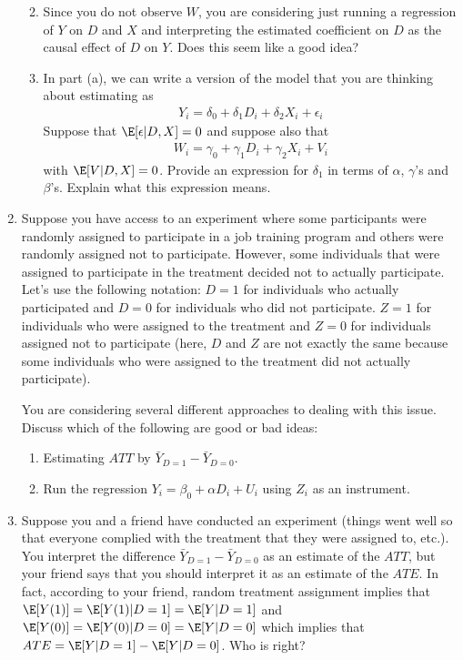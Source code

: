 \documentclass[
  letterpaper,
  DIV=11,
  numbers=noendperiod]{scrreprt}
\begin{document}
\begin{enumerate}
  \begin{enumerate}
  \def\labelenumii{\alph{enumii})}
  \item
    Since you do not observe \(W\), you are considering just running a
    regression of \(Y\) on \(D\) and \(X\) and interpreting the
    estimated coefficient on \(D\) as the causal effect of \(D\) on
    \(Y\). Does this seem like a good idea?
  \item
    In part (a), we can write a version of the model that you are
    thinking about estimating as \begin{align*}
       Y_i = \delta_0 + \delta_1 D_i + \delta_2 X_i + \epsilon_i
     \end{align*} Suppose that \(\E[\epsilon | D, X] = 0\) and suppose
    also that \begin{align*}
    W_i = \gamma_0 + \gamma_1 D_i + \gamma_2 X_i + V_i
      \end{align*} with \(\E[V|D,X]=0\). Provide an expression for
    \(\delta_1\) in terms of \(\alpha\), \(\gamma\)'s and \(\beta\)'s.
    Explain what this expression means.
  \end{enumerate}
\item
  Suppose you have access to an experiment where some participants were
  randomly assigned to participate in a job training program and others
  were randomly assigned not to participate. However, some individuals
  that were assigned to participate in the treatment decided not to
  actually participate. Let's use the following notation: \(D=1\) for
  individuals who actually participated and \(D=0\) for individuals who
  did not participate. \(Z=1\) for individuals who were assigned to the
  treatment and \(Z=0\) for individuals assigned not to participate
  (here, \(D\) and \(Z\) are not exactly the same because some
  individuals who were assigned to the treatment did not actually
  participate).

  You are considering several different approaches to dealing with this
  issue. Discuss which of the following are good or bad ideas:

  \begin{enumerate}
  \def\labelenumii{\alph{enumii})}
  \item
    Estimating \(ATT\) by \(\bar{Y}_{D=1} - \bar{Y}_{D=0}\).
  \item
    Run the regression \(Y_i = \beta_0 + \alpha D_i + U_i\) using
    \(Z_i\) as an instrument.
  \end{enumerate}
\item
  Suppose you and a friend have conducted an experiment (things went
  well so that everyone complied with the treatment that they were
  assigned to, etc.). You interpret the difference
  \(\bar{Y}_{D=1} - \bar{Y}_{D=0}\) as an estimate of the \(ATT\), but
  your friend says that you should interpret it as an estimate of the
  \(ATE\). In fact, according to your friend, random treatment
  assignment implies that \(\E[Y(1)] = \E[Y(1)|D=1] = \E[Y|D=1]\) and
  \(\E[Y(0)] = \E[Y(0)|D=0] = \E[Y|D=0]\) which implies that
  \(ATE = \E[Y|D=1] - \E[Y|D=0]\). Who is right?
\end{enumerate}
\end{document}
